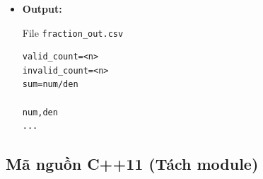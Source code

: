 \begin{itemize}
\begin{itemize}
    \end{itemize}

    \item \textbf{Output:}

    File \texttt{fraction\_out.csv}

\begin{lstlisting}
valid_count=<n>
invalid_count=<n>
sum=num/den

num,den
...
\end{lstlisting}

\end{itemize}

\subsection{Mã nguồn C++11 (Tách module)}

